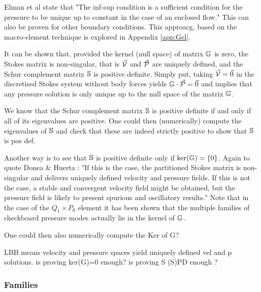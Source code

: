 Elman et al \cite{elsw} state that "The inf-sup condition is a sufficient condition for the pressure to be unique up
to  constant in the case of an enclosed flow." This can also be proven for other boundary conditions.
This approacg, based on the macro-element technique is explored in Appendix \ref{app:Gel}.


It can be shown that, provided the kernel (null space) of matrix ${\mathbb{G}}$ is zero,
the Stokes matrix is non-singular, that is $\vec{\cal V}$ and $\vec{\cal P}$ 
are uniquely defined, and the Schur complement matrix ${\mathbb{S}}$ is positive definite. 
Simply put, taking $\vec{\cal V}=\vec{0}$ in the discretised Stokes system 
without body forces yields ${\mathbb{G}} \cdot \vec{\cal P}=\vec{0}$ and implies
that any pressure solution is only unique up to the null space of the matrix ${\mathbb{G}}$.

We know that the Schur complement matrix ${\mathbb{S}}$ is positive definite if and only if all of its eigenvalues are positive.
One could then (numerically) compute the eigenvalues of ${\mathbb{S}}$ and check that these are indeed strictly positive
to show that ${\mathbb{S}}$ is pos def. 


Another way is to see that ${\mathbb{S}}$ is positive definite only if $\text{ker}({\mathbb{G}})=\{0\}$.
Again to quote Donea \& Huerta \cite{dohu03}: "If this is the case, the partitioned Stokes matrix  
is non-singular and delivers uniquely defined velocity and pressure fields. If this is not the case, a
stable and convergent velocity field might be obtained, but the pressure field is likely
to present spurious and oscillatory results." 
Note that in the case of the $Q_1 \times P_0$ element it has been shown that the multiple families of 
checkboard pressure modes actually lie in the kernel of ${\mathbb{G}}$. \cite{XXXXsani}

One could then also numerically compute the Ker of G?

\vspace{.4cm}

LBB means velocity and pressure spaces yield uniquely defined vel and p solutions. 
is proving ker(G)=0 enough? is proving S (S)PD enough ?




\subsubsection{Families}

